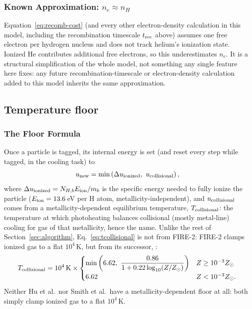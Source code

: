 \subsubsection{Known Approximation: $n_e \approx n_H$}

Equation~\ref{eq:recomb-cost}
(and every other electron-density calculation in this model, including
the recombination timescale $t_{\rm rec}$ above) assumes one free
electron per hydrogen nucleus and does not track helium's ionization
state.
Ionized He contributes additional free electrons, so this
underestimates $n_e$. It is a structural simplification of the whole
model, not something any single feature here fixes: any future
recombination-timescale or electron-density calculation added to this
model inherits the same approximation.

\subsection{Temperature floor}
\label{sec:temperature-floor}

\subsubsection{The Floor Formula}

Once a particle is tagged, its internal energy is set (and reset every
step while tagged, in the cooling task) to
\begin{equation}
  u_{\rm new} = \min\left(\Delta u_{\rm ionized},\ u_{\rm collisional}\right),
  \label{eq:floor}
\end{equation}
where $\Delta u_{\rm ionized} = N_{H,b} E_{\rm ion}/m_b$ is the specific
energy needed to fully ionize the particle ($E_{\rm ion}=13.6\,$eV per
H atom, metallicity-independent), and $u_{\rm collisional}$ comes from
a metallicity-dependent equilibrium temperature, $T_{\rm collisional}$:
the temperature at which photoheating balances collisional (mostly
metal-line) cooling for gas of that metallicity, hence the name.
Unlike the rest of Section~\ref{sec:algorithm}, Eq.~\ref{eq:tcollisional}
is not from FIRE-2: FIRE-2 clamps ionized gas to a flat $10^4\,$K, but from
its successor, \citet[][the metallicity-dependent photoionization
temperature fit]{Hopkins2023}:
\begin{equation}
  T_{\rm collisional} = 10^4\,{\rm K} \times
  \begin{cases}
    \min\left(6.62,\ \dfrac{0.86}{1+0.22\log_{10}(Z/Z_\odot)}\right) & Z \ge 10^{-3}Z_\odot \\[2mm]
    6.62 & Z < 10^{-3}Z_\odot.
  \end{cases}
  \label{eq:tcollisional}
\end{equation}
Neither Hu et al.\ nor Smith et al.\ have a metallicity-dependent floor
at all: both simply clamp ionized gas to a flat $10^4\,$K.

